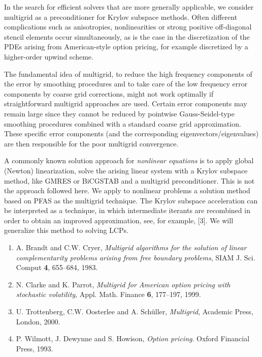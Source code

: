 \documentclass[11pt]{article}
\begin{document}
In the search for efficient solvers that are more generally
applicable, we consider multigrid as a preconditioner for
Krylov subspace methods.  Often different complications
such as anisotropies, nonlinearities or strong positive
off-diagonal stencil elements occur simultaneously, as is
the case in the discretization of the PDEs arising from
American-style option pricing, for example discretized by a
higher-order upwind scheme.

The fundamental idea of multigrid, to reduce the high
frequency components of the error by smoothing procedures
and to take care of the low frequency error components by
coarse grid corrections, might not work optimally if
straightforward multigrid approaches are used.  Certain
error components may remain large since they cannot be
reduced by pointwise Gauss-Seidel-type smoothing procedures
combined with a standard coarse grid approximation. These
specific error components (and the corresponding
eigenvectors/eigenvalues) are then responsible for the poor
multigrid convergence.

A commonly known solution approach for {\em nonlinear
equations} is to apply global (Newton) linearization,
solve the arising linear system with a Krylov subspace
method, like GMRES or BiCGSTAB and a multigrid
preconditioner.  This is not the approach followed here.
We apply to nonlinear problems a solution method based on
PFAS as the multigrid technique.  The Krylov subspace
acceleration can be interpreted as a technique, in which
intermediate iterants are recombined in order to obtain an
improved approximation, see, for example, [3].  We will
generalize this method to solving LCPs.

\begin{enumerate}

\item
A. Brandt and C.W. Cryer,
{\em Multigrid algorithms for the solution of linear
complementarity problems arising from free boundary problems},
SIAM J. Sci. Comput {\bf 4}, 655--684, 1983.


\item
N. Clarke and K. Parrot,
{\em Multigrid for American option pricing with stochastic
volatility}, Appl. Math. Finance {\bf 6}, 177--197, 1999.

\item
U. Trottenberg, C.W. Oosterlee and A. Sch\"uller,
{\em Multigrid}, Academic Press, London,  2000.

\item
P. Wilmott, J. Dewynne and S. Howison,
{\em Option pricing}. Oxford Financial Press, 1993.

\end{enumerate}
\end{document}
